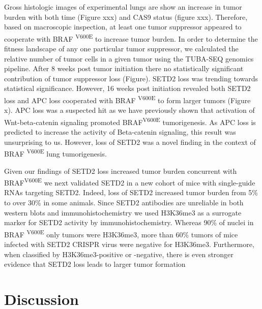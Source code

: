 Gross histologic images of experimental lungs are show an increase in tumor burden with both time (Figure xxx) and CAS9 status (figure xxx). Therefore, based on macroscopic inspection, at least one tumor suppressor appeared to cooperate with BRAF \textsuperscript{V600E} to increase tumor burden. In order to determine the fitness landscape of any one particular tumor suppressor, we calculated the relative number of tumor cells in a given tumor using the TUBA-SEQ genomics pipeline. After 8 weeks post tumor initiation there no statistically significant contribution of tumor suppressor loss (Figure). SETD2 loss was trending towards statistical significance. However, 16 weeks post initiation revealed both SETD2 loss and APC loss cooperated with BRAF \textsuperscript{V600E} to form larger tumors (Figure x). APC loss was a suspected hit as we have previously shown that activation of Wnt-beta-catenin signaling promoted BRAF\textsuperscript{V600E} tumorigenesis. As APC loss is predicted to increase the activity of Beta-catenin signaling, this result was unsurprising to us. However, loss of SETD2 was a novel finding in the context of BRAF \textsuperscript{V600E} lung tumorigenesis.

Given our findings of SETD2 loss increased tumor burden concurrent with BRAF\textsuperscript{V600E} we next validated SETD2 in a new cohort of mice with single-guide RNAs targeting SETD2. Indeed, loss of SETD2 increased tumor burden from 5\% to over 30\% in some animals. Since SETD2 antibodies are unreliable in both western blots and immunohistochemistry we used H3K36me3 as a surrogate marker for SETD2 activity by immunohistochemistry. Whereas 90\% of nuclei in BRAF \textsuperscript{V600E} only tumors were H3K36me3, more than 60\% tumors of mice infected with SETD2 CRISPR virus were negative for H3K36me3. Furthermore, when classified by H3K36me3-positive or -negative, there is even stronger evidence that SETD2 loss leads to larger tumor formation

\hypertarget{discussion}{%
\section{Discussion}\label{discussion}}

